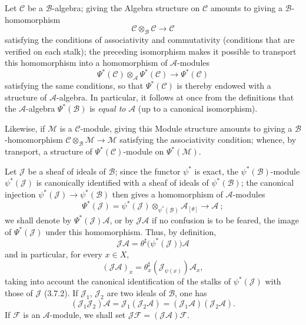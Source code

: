 \begin{env}[4.3.4]
\label{0.4.3.4}
Let $\mathcal{C}$ be a $\mathcal{B}$-algebra; giving the Algebra
structure on $\mathcal{C}$ amounts to giving a $\mathcal{B}$-homomorphism
\[
  \mathcal{C}\otimes_{\mathcal{B}}\mathcal{C}\longrightarrow\mathcal{C}
\]
satisfying the conditions of associativity and commutativity (conditions
that are verified on each stalk); the preceding isomorphism makes it possible to
transport this homomorphism into a homomorphism of $\mathcal{A}$-modules
\[
  \Psi^*(\mathcal{C})\otimes_{\mathcal{A}}\Psi^*(\mathcal{C})
  \longrightarrow\Psi^*(\mathcal{C})
\]
satisfying the same conditions, so that $\Psi^*(\mathcal{C})$ is thereby endowed
with a structure of $\mathcal{A}$-algebra. In particular, it follows at once
from the definitions that the $\mathcal{A}$-algebra $\Psi^*(\mathcal{B})$ is \emph{equal to}
$\mathcal{A}$ (up to a canonical isomorphism).

Likewise, if $\mathcal{M}$ is a $\mathcal{C}$-module, giving this
Module structure amounts
to giving a $\mathcal{B}$-homomorphism
$\mathcal{C}\otimes_{\mathcal{B}}\mathcal{M}\to\mathcal{M}$ satisfying the
associativity condition; whence, by transport, a structure of
$\Psi^*(\mathcal{C})$-module on $\Psi^*(\mathcal{M})$.
\end{env}

\begin{env}[4.3.5]
\label{0.4.3.5}
Let $\mathcal{J}$ be a sheaf of ideals of $\mathcal{B}$; since the functor
$\psi^*$ is exact, the $\psi^*(\mathcal{B})$-module $\psi^*(\mathcal{J})$
is canonically identified with a sheaf of ideals of $\psi^*(\mathcal{B})$;
the canonical injection $\psi^*(\mathcal{J})\to\psi^*(\mathcal{B})$ then gives
a homomorphism of $\mathcal{A}$-modules
\[
  \Psi^*(\mathcal{J})
  =\psi^*(\mathcal{J})\otimes_{\psi^*(\mathcal{B})}\mathcal{A}_{[\theta]}
  \longrightarrow\mathcal{A}~;
\]
we shall denote by $\Psi^*(\mathcal{J})\mathcal{A}$, or by
$\mathcal{J}\mathcal{A}$ if no confusion is to be feared, the image of
$\Psi^*(\mathcal{J})$ under this homomorphism. Thus, by definition,
\[
  \mathcal{J}\mathcal{A}
  =\theta^\sharp\bigl(\psi^*(\mathcal{J})\bigr)\mathcal{A}
\]
and in particular, for every $x\in X$,
\[
  (\mathcal{J}\mathcal{A})_x
  =\theta_x^\sharp(\mathcal{J}_{\psi(x)})\mathcal{A}_x,
\]
taking into account the canonical identification of the stalks of
$\psi^*(\mathcal{J})$ with those of $\mathcal{J}$ (3.7.2). If
$\mathcal{J}_1$, $\mathcal{J}_2$ are two ideals of $\mathcal{B}$, one has
\[
  (\mathcal{J}_1\mathcal{J}_2)\mathcal{A}
  =\mathcal{J}_1(\mathcal{J}_2\mathcal{A})
  =(\mathcal{J}_1\mathcal{A})(\mathcal{J}_2\mathcal{A}).
\]
If $\mathcal{F}$ is an $\mathcal{A}$-module, we shall set
$\mathcal{J}\mathcal{F}=(\mathcal{J}\mathcal{A})\mathcal{F}$.
\end{env}

